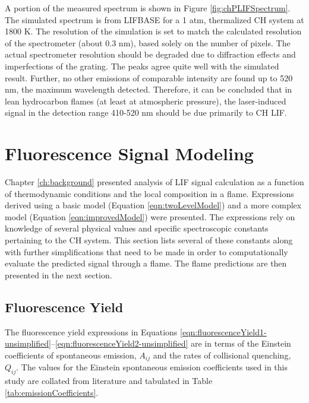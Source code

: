 A portion of the measured spectrum is shown in Figure \ref{fig:chPLIFSpectrum}.
The simulated spectrum is from LIFBASE for a 1 atm, thermalized CH system at 1800 K.
The resolution of the simulation is set to match the calculated resolution of the spectrometer (about 0.3 nm), based solely on the number of pixels. The actual spectrometer resolution should be degraded due to diffraction effects and imperfections of the grating.
The peaks agree quite well with the simulated result. Further, no other emissions of comparable intensity are found up to 520 nm, the maximum wavelength detected. Therefore, it can be concluded that in lean hydrocarbon flames (at least at atmospheric pressure), the laser-induced signal in the detection range 410-520 nm should be due primarily to CH LIF.



\section{Fluorescence Signal Modeling}
\label{sec:chplif-fluorescence-signal-modeling}

Chapter \ref{ch:background} presented analysis of LIF signal calculation as a function of thermodynamic conditions and the local composition in a flame.
Expressions derived using a basic model (Equation \ref{eqn:twoLevelModel}) and a more complex model (Equation \ref{eqn:improvedModel}) were presented.
The expressions rely on knowledge of several physical values and specific spectroscopic constants pertaining to the CH system.
This section lists several of these constants along with further simplifications that need to be made in order to computationally evaluate the predicted signal through a flame. The flame predictions are then presented in the next section.

\subsection{Fluorescence Yield}
\label{subsec:modeling-fluorescence-yield}

The fluorescence yield expressions in Equations \ref{eqn:fluorescenceYield1-unsimplified}--\ref{eqn:fluorescenceYield2-unsimplified} are in terms of the Einstein coefficients of spontaneous emission, \(A_{ij}\) and the rates of collisional quenching, \(Q_{ij}\).
The values for the Einstein spontaneous emission coefficients used in this study are collated from literature\cite{1985-garland-a,1996-luque-b} and tabulated in Table \ref{tab:emissionCoefficients}.

